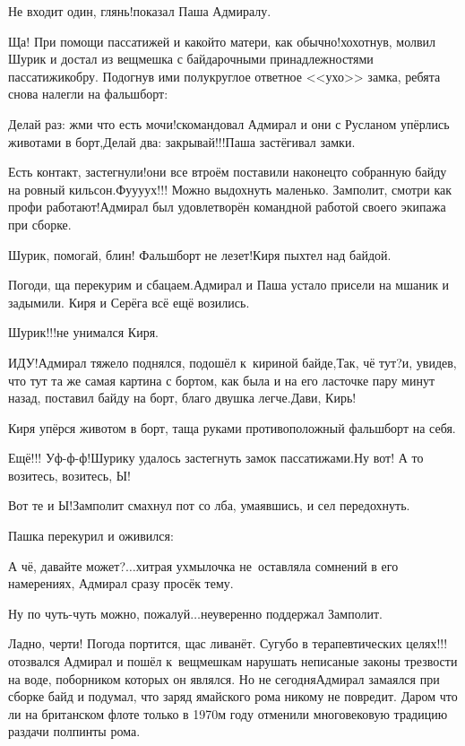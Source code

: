 \diagdash Не входит один, глянь!\mdash показал Паша Адмиралу.

\diagdash Ща! При помощи пассатижей и какой\sdash то матери, как обычно!\mdash хохотнув, молвил Шурик и достал из вещмешка с байдарочными принадлежностями пассатижи\sdash кобру. Подогнув ими полукруглое ответное <<ухо>> замка, ребята снова налегли на фальшборт:

\diagdash Делай раз: жми что есть мочи!\mdash скомандовал Адмирал и они с Русланом упёрлись животами в борт,\mdash Делай два: закрывай!!!\mdash Паша застёгивал замки.

\diagdash Есть контакт, застегнули!\mdash они все втроём поставили наконец\sdash то собранную байду на ровный кильсон.\mdash Фу\sdash у\sdash у\sdash ух!!! Можно выдохнуть маленько. Замполит, смотри как профи работают!\mdash Адмирал был удовлетворён командной работой своего экипажа при сборке.

\diagdash Шурик, помогай, блин! Фальшборт не лезет!\mdash Киря пыхтел над байдой.

\diagdash Погоди, ща перекурим и сбацаем.\mdash Адмирал и Паша устало присели на мшаник и задымили. Киря и Серёга всё ещё возились. 

\diagdash Шурик!!!\mdash не унимался Киря.

\diagdash ИДУ!\mdash Адмирал тяжело поднялся, подошёл к~кириной байде,\mdash Так, чё тут?\mdash и, увидев, что тут та же самая картина с бортом, как была и на его ласточке пару минут назад, поставил байду на борт, благо двушка легче.\mdash Дави, Кирь!

Киря упёрся животом в борт, таща руками противоположный фальшборт на себя.

\diagdash Ещё!!! Уф-ф-ф!\mdash Шурику удалось застегнуть замок пассатижами.\mdash Ну вот! А то возитесь, возитесь, Ы!

\diagdash Вот те и Ы!\mdash Замполит смахнул пот со лба, умаявшись, и сел передохнуть.

Пашка перекурил и оживился:

\diagdash А чё, давайте может?$\ldots$\mdash хитрая ухмылочка не~оставляла сомнений в его намерениях, Адмирал сразу просёк тему.

\diagdash Ну по чуть-чуть можно, пожалуй$\ldots$\mdash неуверенно поддержал Замполит.

\diagdash Ладно, черти! Погода портится, щас ливанёт. Сугубо в терапевтических целях!!!\mdash отозвался Адмирал и пошёл к~вещмешкам нарушать неписаные законы трезвости на воде, поборником которых он являлся. Но не сегодня\mdash Адмирал замаялся при сборке байд и подумал, что заряд ямайского рома никому не повредит. Даром что ли на британском флоте только в 1970\sdash м году отменили многовековую традицию раздачи полпинты рома.

